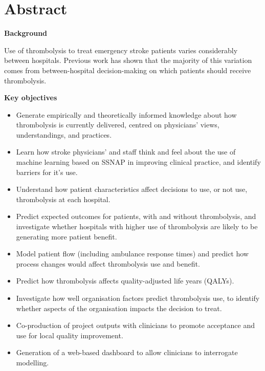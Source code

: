 \section*{Abstract} %

\textbf{Background}

Use of thrombolysis to treat emergency stroke patients varies considerably between hospitals. Previous work has shown that the majority of this variation comes from between-hospital decision-making on which patients should receive thrombolysis.

\textbf{Key objectives}

\begin{itemize}

    \item Generate empirically and theoretically informed knowledge about how thrombolysis is currently delivered, centred on physicians’ views, understandings, and practices.
    
    \item Learn how stroke physicians’ and staff think and feel about the use of machine learning based on SSNAP in improving clinical practice, and identify barriers for it's use.

    \item Understand how patient characteristics affect decisions to use, or not use, thrombolysis at each hospital.

    \item Predict expected outcomes for patients, with and without thrombolysis, and investigate whether hospitals with higher use of thrombolysis are likely to be generating more patient benefit. 
    
    \item Model patient flow (including ambulance response times) and predict how process changes would affect thrombolysis use and benefit.

    \item Predict how thrombolysis affects quality-adjusted life years (QALYs).

    \item Investigate how well organisation factors predict thrombolysis use, to identify whether aspects of the organisation impacts the decision to treat.
    
    \item Co-production of project outputs with clinicians to promote acceptance and use for local quality improvement.

    \item Generation of a web-based dashboard to allow clinicians to interrogate modelling.

\end{itemize}

